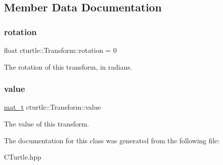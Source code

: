 \subsection{Member Data Documentation}
\mbox{\label{classcturtle_1_1Transform_a79f7e11fb2b3d1093458100783cdd984}} 
\subsubsection{\texorpdfstring{rotation}{rotation}}
{\footnotesize\ttfamily float cturtle\+::\+Transform\+::rotation = 0\hspace{0.3cm}{\ttfamily [protected]}}

The rotation of this transform, in radians. \mbox{\label{classcturtle_1_1Transform_a747be70a22109ecf9470c7ad75565c0c}} 
\subsubsection{\texorpdfstring{value}{value}}
{\footnotesize\ttfamily \hyperlink{classcturtle_1_1Transform_a2952f427614626cb6b72553fb8451d8a}{mat\+\_\+t} cturtle\+::\+Transform\+::value\hspace{0.3cm}{\ttfamily [protected]}}

The value of this transform. 

The documentation for this class was generated from the following file\+:\begin{DoxyCompactItemize}
\item 
C\+Turtle.\+hpp\end{DoxyCompactItemize}
